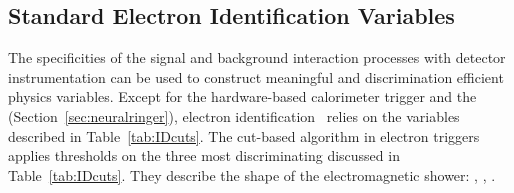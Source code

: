 \subsection{Standard Electron Identification Variables}\label{ssec:std_variables}

The specificities of the signal and background interaction processes with
detector instrumentation can be used to construct meaningful and discrimination
efficient physics variables. Except for the hardware-based calorimeter trigger
and the \rnn (Section~\ref{sec:neuralringer}), electron
identification~\cite{atlas_electron_id_offline} relies on the variables
described in Table~\ref{tab:IDcuts}. 
The cut-based algorithm in electron
triggers applies thresholds on the three most discriminating discussed in Table~\ref{tab:IDcuts}. They describe the shape of the electromagnetic shower: \reta{}, \eratio{}, \rhadone{}.




